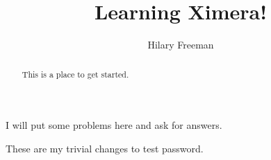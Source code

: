 \documentclass[handout]{ximera}
\title{Learning Ximera!}
\author{Hilary Freeman}
\begin{document}
\begin{abstract}
  This is a place to get started.
\end{abstract}
\maketitle

I will put some problems here and ask for answers.

These are my trivial changes to test password.
\end{document}
